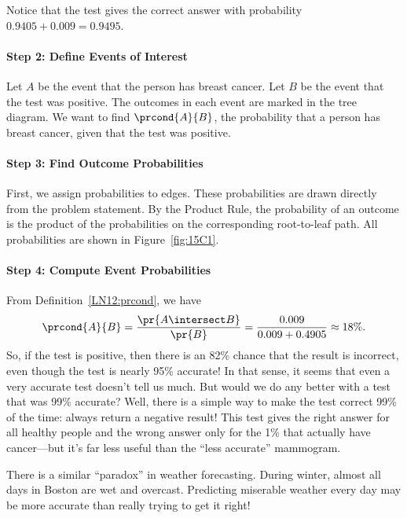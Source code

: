 Notice that the test gives the correct answer with probability $0.9405
+ 0.009 = 0.9495$.

\paragraph{Step 2: Define Events of Interest}

Let $A$ be the event that the person has breast cancer.  Let $B$ be the
event that the test was positive.  The outcomes in each event are marked
in the tree diagram.  We want to find $\prcond{A}{B}$, the probability
that a person has breast cancer, given that the test was positive.

\paragraph{Step 3: Find Outcome Probabilities}

First, we assign probabilities to edges.  These probabilities are
drawn directly from the problem statement.  By the Product Rule, the
probability of an outcome is the product of the probabilities on the
corresponding root-to-leaf path.  All probabilities are shown in
Figure~\ref{fig:15C1}.

\paragraph{Step 4: Compute Event Probabilities}

From Definition~\ref{LN12:prcond}, we have
\begin{equation*}
\prcond{A}{B}	= \frac{\pr{A \intersect B}}{\pr{B}} %
		= \frac{0.009}{0.009 + 0.4905} %
		\approx 18\%.
\end{equation*}
So, if the test is positive, then there is an 82\% chance that the
result is incorrect, even though the test is nearly 95\% accurate!  In
that sense, it seems that even a very accurate test doesn't tell us
much.  But would we do any better with a test that was 99\% accurate?
Well, there is a simple way to make the test correct 99\% of the time:
always return a negative result!  This test gives the right answer for
all healthy people and the wrong answer only for the 1\% that actually
have cancer---but it's far less useful than the ``less accurate''
mammogram.


\begin{editingnotes}
There is a similar ``paradox'' in weather forecasting.  During winter,
almost all days in Boston are wet and overcast.  Predicting miserable
weather every day may be more accurate than really trying to get it
right!
\end{editingnotes}



